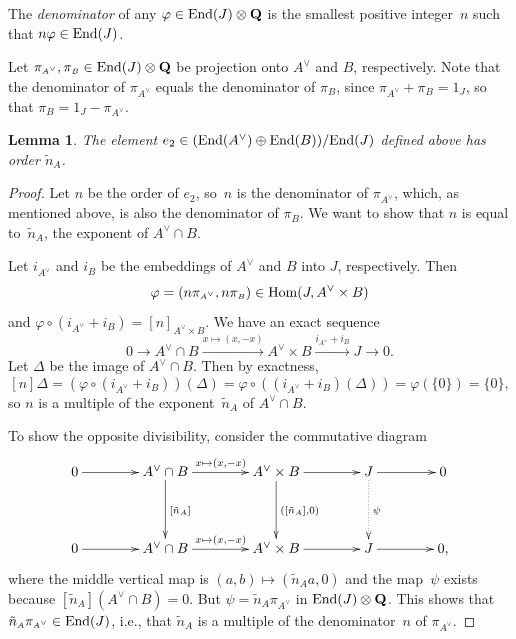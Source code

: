 \documentclass[10pt,twoside]{article}
\newcommand{\Z}{{\bf{Z}}}
\newcommand{\Q}{{\bf{Q}}}
\newcommand{\tensor}{\otimes}
\newcommand{\vphi}{\varphi}
\newcommand{\nAe}{{\tilde{n}_{\scriptscriptstyle{A}}}}
\newcommand{\piAd}{\pi_{\scriptscriptstyle{\Adual}}}
\newcommand{\piB}{\pi_{\scriptscriptstyle{B}}}
\newcommand{\Adual}{A^{\vee}}
\newcommand{\Hom}{{\rm Hom}}
\newcommand{\End}{{\rm End}}
\newcommand{\xra}{\xrightarrow}
\renewcommand{\H}{\HHH}
\newtheorem{lem}{Lemma}[section]
\theoremstyle{definition}
\DeclareMathOperator{\HHH}{H}
\begin{document}


The {\em denominator} of any $\vphi\in\End(J)\tensor\Q$ is the
smallest positive integer~$n$ such that $n\vphi\in\End(J)$. 

Let $\piAd, \piB \in \End(J)\tensor\Q$ be projection onto
$\Adual$ and $B$, respectively.  Note that the denominator of
$\piAd$ equals the denominator of $\piB$, since $\piAd
+ \piB = 1_J$, so that $\piB = 1_J - \piAd$. 

\begin{lem}\label{lem:ord_e2}
The element $e_2\in (\End(\Adual) \oplus \End(B))/\End(J)$ 
defined above has order $\nAe$. 
\end{lem}
\begin{proof}
Let $n$ be the order of $e_2$, so~$n$ is the denominator
of $\piAd$, which, as mentioned above, is also the
denominator of $\piB$. We want to show that $n$ is equal
to~$\nAe$, the exponent of $\Adual\cap B$. 

Let $i_{\Adual}$ and $i_B$
be the embeddings of $\Adual$ and $B$ into $J$, respectively. 
Then $$\vphi = (n\piAd,n\piB)\in\Hom(J,\Adual\times B)$$
and $\vphi\circ (i_{\Adual} + i_B) = [n]_{\Adual\times B}.$
We have an exact sequence
$$
0\to \Adual\cap B\xra{x\mapsto (x,-x)}\Adual\times B \xra{i_{\Adual} + i_B}  J \to 0. 
$$
Let $\Delta$ be the image of $\Adual\cap B$.  Then by exactness,
$$
 [n]\Delta =  (\vphi\circ (i_{\Adual} + i_B))(\Delta) = 
\vphi\circ ((i_{\Adual} + i_B)(\Delta)) = \vphi(\{0\}) = \{0\},
$$
so $n$ is a multiple of
the exponent~$\nAe$ of $\Adual\cap B$. 

To show the opposite divisibility, consider the
commutative diagram
$$
\xymatrix@=4em{
0 \ar[r] & {\Adual \cap B} \ar[r]^{x\mapsto (x,-x)}\ar[d]^{[\nAe]}& 
       {\Adual \times B}\ar[d]^{([\nAe],0)}
                  \ar[r]& J \ar[r]\ar@{.>}[d]^{\psi} & 0\\
0 \ar[r] & {\Adual \cap B} \ar[r]^{x\mapsto (x,-x)}& {\Adual \times B}
                  \ar[r]& J \ar[r] & 0,
}
$$
where the middle vertical map is $(a,b)\mapsto (\nAe a,0)$
and the map~$\psi$ exists because $[\nAe](\Adual\cap B)=0$. 
But $\psi = \nAe \piAd$ in $\End(J)\tensor\Q$. 
This shows that $\nAe \piAd \in \End(J)$, i.e.,
that $\nAe$ is a multiple of the
denominator~$n$ of $\piAd$. 

\end{proof}
\end{document}
